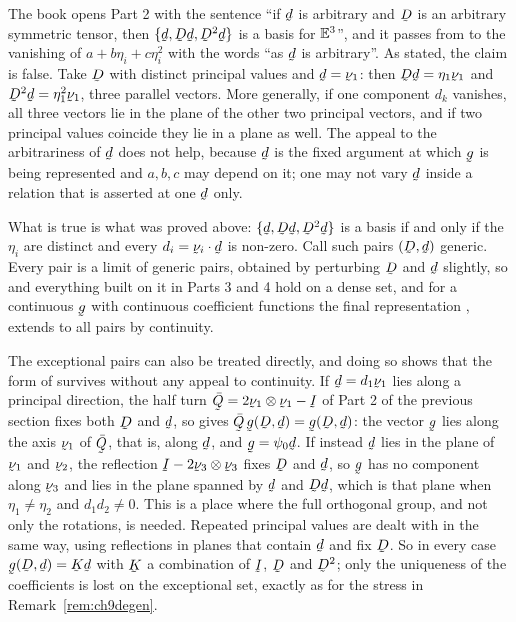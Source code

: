 \begin{remark}
\label{rem:ch9generic}
The book opens Part 2 with the sentence ``if $\bd$ is arbitrary and $\bD$
is an arbitrary symmetric tensor, then $\{\bd,\bD\bd,\bD^{2}\bd\}$ is a
basis for $\mathbb{E}^{3}$'', and it passes from  to the vanishing of
$a+b\eta_{i}+c\eta_{i}^{2}$ with the words ``as $\bd$ is arbitrary''. As
stated, the claim is false. Take $\bD$ with distinct principal values
and $\bd=\bnu_{1}$: then $\bD\bd=\eta_{1}\bnu_{1}$ and
$\bD^{2}\bd=\eta_{1}^{2}\bnu_{1}$, three parallel vectors. More generally,
if one component $d_{k}$ vanishes, all three vectors lie in the plane of
the other two principal vectors, and if two principal values coincide
they lie in a plane as well. The appeal to the arbitrariness of $\bd$
does not help, because $\bd$ is the fixed argument at which $\bg$ is being
represented and $a,b,c$ may depend on it; one may not vary $\bd$ inside a
relation that is asserted at one $\bd$ only.

What is true is what was proved above: $\{\bd,\bD\bd,\bD^{2}\bd\}$ is a
basis if and only if the $\eta_{i}$ are distinct and every
$d_{i}=\ip{\bnu_{i}}\bd$ is non-zero. Call such pairs $(\bD,\bd)$ generic.
Every pair is a limit of generic pairs, obtained by perturbing $\bD$ and
$\bd$ slightly, so  and everything built on it in Parts 3 and 4
hold on a dense set, and for a continuous $\bg$ with continuous
coefficient functions the final representation , 
extends to all pairs by continuity.

The exceptional pairs can also be treated directly, and doing so shows
that the form of  survives without any appeal to continuity.
If $\bd=d_{1}\bnu_{1}$ lies along a principal direction, the half turn
$\bar\bQ=2\bnu_{1}\otimes\bnu_{1}-\I$ of Part 2 of the previous section
fixes both $\bD$ and $\bd$, so  gives
$\bar\bQ\,\bg(\bD,\bd)=\bg(\bD,\bd)$: the vector $\bg$ lies along the
axis $\bnu_{1}$ of $\bar\bQ$, that is, along $\bd$, and $\bg=\psi_{0}\bd$.
If instead $\bd$ lies in the plane of $\bnu_{1}$ and $\bnu_{2}$, the
reflection $\I-2\bnu_{3}\otimes\bnu_{3}$ fixes $\bD$ and $\bd$, so $\bg$
has no component along $\bnu_{3}$ and lies in the plane spanned by $\bd$
and $\bD\bd$, which is that plane when $\eta_{1}\neq\eta_{2}$ and
$d_{1}d_{2}\neq0$. This is a place where the full orthogonal group, and
not only the rotations, is needed. Repeated principal values are dealt
with in the same way, using reflections in planes that contain $\bd$ and
fix $\bD$. So in every case $\bg(\bD,\bd)=\bK\bd$ with $\bK$ a
combination of $\I$, $\bD$ and $\bD^{2}$; only the uniqueness of the
coefficients is lost on the exceptional set, exactly as for the stress in
Remark~\ref{rem:ch9degen}.
\end{remark}

